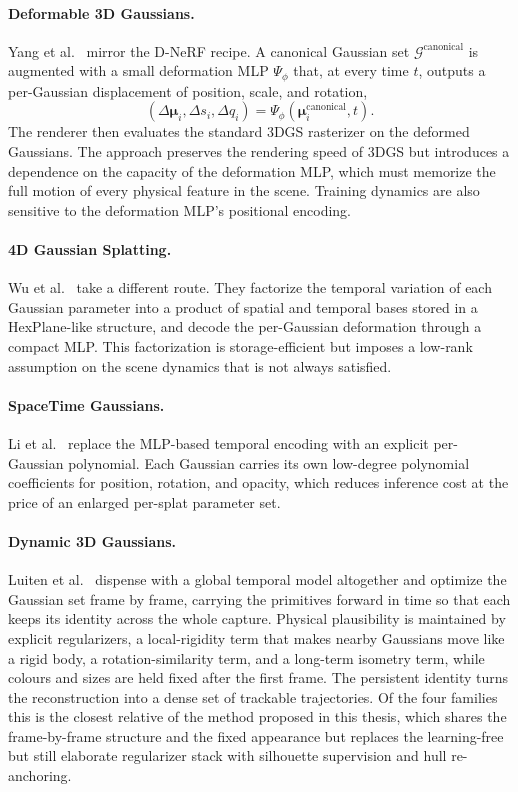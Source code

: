 \paragraph{Deformable 3D Gaussians.} Yang et al.~\cite{yang2024deformable}
mirror the D-NeRF recipe. A canonical Gaussian set
$\mathcal{G}^\text{canonical}$ is augmented with a small deformation MLP
$\Psi_\phi$ that, at every time $t$, outputs a per-Gaussian displacement of
position, scale, and rotation,
\begin{equation}
    (\Delta \boldsymbol{\mu}_i, \Delta s_i, \Delta q_i) = \Psi_\phi(\boldsymbol{\mu}_i^\text{canonical}, t).
\end{equation}
The renderer then evaluates the standard 3DGS rasterizer on the deformed
Gaussians. The approach preserves the rendering speed of 3DGS but introduces a
dependence on the capacity of the deformation MLP, which must memorize the full
motion of every physical feature in the scene. Training dynamics are also
sensitive to the deformation MLP's positional encoding.

\paragraph{4D Gaussian Splatting.} Wu et al.~\cite{wu20244dgs} take a different
route. They factorize the temporal variation of each Gaussian parameter into a
product of spatial and temporal bases stored in a HexPlane-like structure, and
decode the per-Gaussian deformation through a compact MLP. This factorization is
storage-efficient but imposes a low-rank assumption on the scene dynamics that
is not always satisfied.

\paragraph{SpaceTime Gaussians.} Li et al.~\cite{li2024spacetime} replace the
MLP-based temporal encoding with an explicit per-Gaussian polynomial. Each
Gaussian carries its own low-degree polynomial coefficients for position,
rotation, and opacity, which reduces inference cost at the price of an enlarged
per-splat parameter set.

\paragraph{Dynamic 3D Gaussians.} Luiten et al.~\cite{luiten2024dynamic}
dispense with a global temporal model altogether and optimize the Gaussian set
frame by frame, carrying the primitives forward in time so that each keeps its
identity across the whole capture. Physical plausibility is maintained by
explicit regularizers, a local-rigidity term that makes nearby Gaussians move
like a rigid body, a rotation-similarity term, and a long-term isometry term,
while colours and sizes are held fixed after the first frame. The persistent
identity turns the reconstruction into a dense set of trackable trajectories. Of
the four families this is the closest relative of the method proposed in this
thesis, which shares the frame-by-frame structure and the fixed appearance but
replaces the learning-free but still elaborate regularizer stack with silhouette
supervision and hull re-anchoring.

